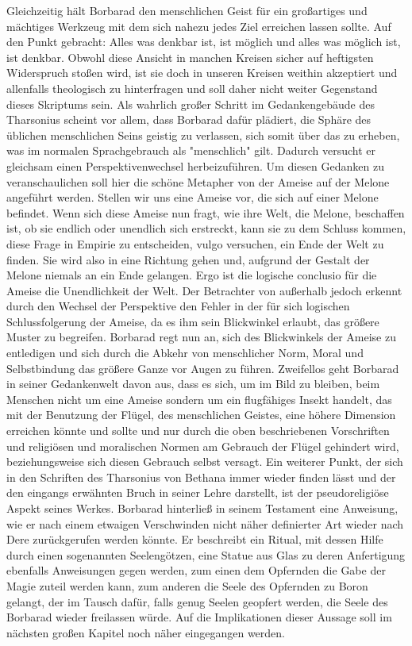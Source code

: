 \documentclass[11pt]{article}
\begin{document}
Gleichzeitig hält Borbarad den menschlichen Geist für ein großartiges und mächtiges Werkzeug mit dem
sich nahezu jedes Ziel erreichen lassen sollte. Auf den Punkt gebracht: Alles was denkbar ist, ist möglich
und alles was möglich ist, ist denkbar. Obwohl diese Ansicht in manchen Kreisen sicher auf heftigsten
Widerspruch stoßen wird, ist sie doch in unseren Kreisen weithin akzeptiert und allenfalls theologisch zu
hinterfragen und soll daher nicht weiter Gegenstand dieses Skriptums sein.
Als wahrlich großer Schritt im Gedankengebäude des Tharsonius scheint vor allem, dass Borbarad dafür
plädiert, die Sphäre des üblichen menschlichen Seins geistig zu verlassen, sich somit über das zu erheben, was im normalen Sprachgebrauch als "menschlich" gilt. Dadurch versucht er gleichsam einen Perspektivenwechsel herbeizuführen. Um diesen Gedanken zu veranschaulichen soll hier die schöne Metapher von der Ameise auf der Melone angeführt werden. Stellen wir uns eine Ameise vor, die sich auf
einer Melone befindet. Wenn sich diese Ameise nun fragt, wie ihre Welt, die Melone, beschaffen ist, ob
sie endlich oder unendlich sich erstreckt, kann sie zu dem Schluss kommen, diese Frage in Empirie zu
entscheiden, vulgo versuchen, ein Ende der Welt zu finden. Sie wird also in eine Richtung gehen und,
aufgrund der Gestalt der Melone niemals an ein Ende gelangen. Ergo ist die logische conclusio für die
Ameise die Unendlichkeit der Welt. Der Betrachter von außerhalb jedoch erkennt durch den Wechsel der
Perspektive den Fehler in der für sich logischen Schlussfolgerung der Ameise, da es ihm sein Blickwinkel
erlaubt, das größere Muster zu begreifen. Borbarad regt nun an, sich des Blickwinkels der Ameise zu
entledigen und sich durch die Abkehr von menschlicher Norm, Moral und Selbstbindung das größere
Ganze vor Augen zu führen. Zweifellos geht Borbarad in seiner Gedankenwelt davon aus, dass es sich,
um im Bild zu bleiben, beim Menschen nicht um eine Ameise sondern um ein flugfähiges Insekt handelt,
das mit der Benutzung der Flügel, des menschlichen Geistes, eine höhere Dimension erreichen könnte
und sollte und nur durch die oben beschriebenen Vorschriften und religiösen und moralischen Normen
am Gebrauch der Flügel gehindert wird, beziehungsweise sich diesen Gebrauch selbst versagt.
Ein weiterer Punkt, der sich in den Schriften des Tharsonius von Bethana immer wieder finden lässt und
der den eingangs erwähnten Bruch in seiner Lehre darstellt, ist der pseudoreligiöse Aspekt seines Werkes. Borbarad hinterließ in seinem Testament eine Anweisung, wie er nach einem etwaigen Verschwinden nicht näher definierter Art wieder nach Dere zurückgerufen werden könnte. Er beschreibt ein Ritual,
mit dessen Hilfe durch einen sogenannten Seelengötzen, eine Statue aus Glas zu deren Anfertigung
ebenfalls Anweisungen gegen werden, zum einen dem Opfernden die Gabe der Magie zuteil werden
kann, zum anderen die Seele des Opfernden zu Boron gelangt, der im Tausch dafür, falls genug Seelen
geopfert werden, die Seele des Borbarad wieder freilassen würde. Auf die Implikationen dieser Aussage
soll im nächsten großen Kapitel noch näher eingegangen werden.
\end{document}
